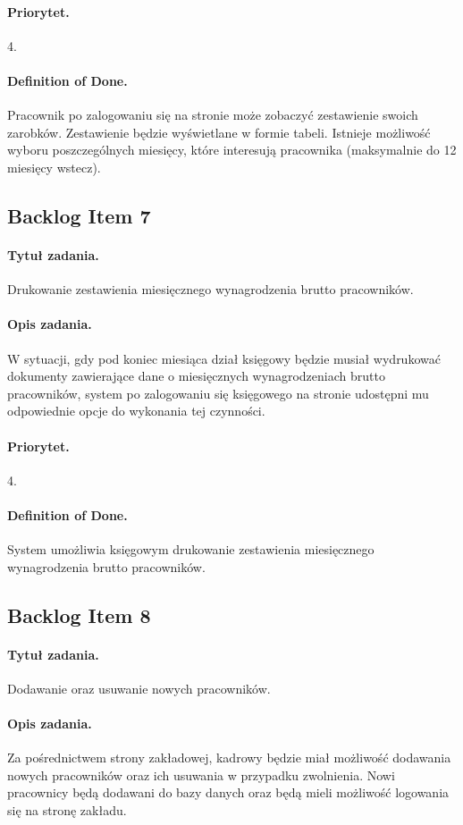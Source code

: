 \documentclass[a4paper]{article}
\begin{document}
\paragraph{Priorytet.} 4.
\paragraph{Definition of Done.} Pracownik po zalogowaniu się na stronie może zobaczyć zestawienie swoich zarobków. Zestawienie będzie wyświetlane w formie tabeli. Istnieje możliwość wyboru poszczególnych miesięcy, które interesują pracownika (maksymalnie do 12 miesięcy wstecz).

\subsection{Backlog Item 7}
\paragraph{Tytuł zadania.} Drukowanie zestawienia miesięcznego wynagrodzenia brutto pracowników.
\paragraph{Opis zadania.} W sytuacji, gdy pod koniec miesiąca dział księgowy będzie musiał wydrukować dokumenty zawierające dane o miesięcznych wynagrodzeniach brutto pracowników, system po zalogowaniu się księgowego na stronie udostępni mu odpowiednie opcje do wykonania tej czynności.
\paragraph{Priorytet.} 4.
\paragraph{Definition of Done.} System umożliwia księgowym drukowanie zestawienia miesięcznego wynagrodzenia brutto pracowników.

\subsection{Backlog Item 8}
\paragraph{Tytuł zadania.} Dodawanie oraz usuwanie nowych pracowników.
\paragraph{Opis zadania.} Za pośrednictwem strony zakładowej, kadrowy będzie miał możliwość dodawania nowych pracowników oraz ich usuwania w przypadku zwolnienia. Nowi pracownicy będą dodawani do bazy danych oraz będą mieli możliwość logowania się na stronę zakładu.
\end{document}
